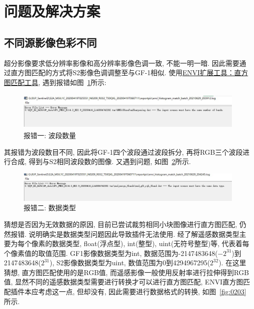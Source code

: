 \section{问题及解决方案}

\subsection{不同源影像色彩不同}
超分影像要求低分辨率影像和高分辨率影像色调一致, 不能一明一暗. 因此需要通过直方图匹配的方式将S2影像色调调整至与GF-1相似. 使用\href{http://blog.sina.com.cn/s/blog_764b1e9d0102vqws.html}{ENVI扩展工具：直方图匹配工具}, 遇到报错如图~\ref{fig:0201}所示: 

\begin{figure}[!htbp]
    \centering
    \includegraphics[height=5em]{pic/q0100a.jpg}
    \caption{报错一: 波段数量}
    \label{fig:0201}
\end{figure}

其报错为波段数目不同, 因此将GF-1四个波段通过波段拆分, 再将RGB三个波段进行合成, 得到与S2相同波段数的图像. 又遇到问题, 如图~\ref{fig:0202}所示. 

\begin{figure}[!htbp]
    \centering
    \includegraphics[height=4em]{pic/q0100b.jpg}
    \caption{报错二: 数据类型}
    \label{fig:0202}
\end{figure}

猜想是否因为无效数据的原因, 目前已尝试裁剪相同小块图像进行直方图匹配, 仍然报错. 说明确实是数据类型问题因此导致插件无法使用. 经了解遥感数据类型主要为每个像素的数据类型, float(浮点型), int(整型), uint(无符号整型)等, 代表着每个像素值的取值范围. GF1影像数据类型为int, 数据范围为-2147483648($-2^{31}$)到2147483648($2^{31}$), S2影像数据类型为uint, 数值范围为0到4294967295($2^{32}$). 在这里猜想, 直方图匹配使用的是RGB值, 而遥感影像一般使用反射率进行拉伸得到RGB值, 显然不同的遥感数据类型需要进行转换才可以进行直方图匹配, ENVI直方图匹配插件本应考虑这一点, 但却没有, 因此需要进行数据格式的转换, 如图~\ref{fig:0203}所示.

